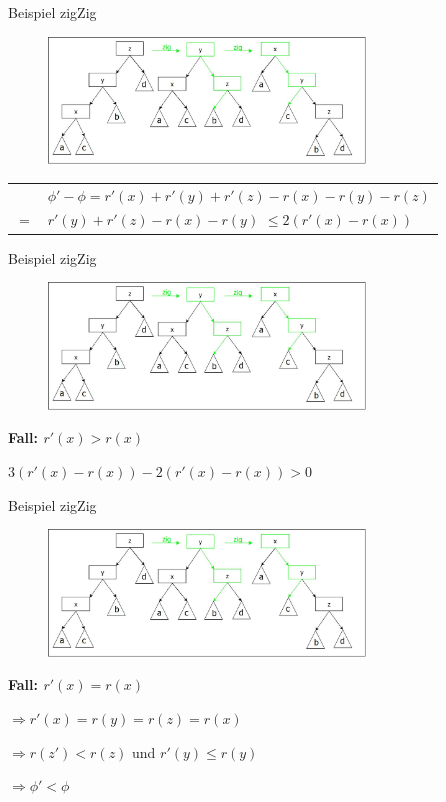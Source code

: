 \documentclass[11pt]{beamer}
\begin{document}
	
	
	
		\begin{frame} {Beispiel zigZig }
				\begin{figure}[h]
				\centering
				\includegraphics[width=0.75\textwidth]{"bilder/zigzigRotation"}
			\end{figure}
			
				\begin{tabular}{ll}
					& $\phi' - \phi = r'(x) + r'(y)+ r'(z) - r(x) - r(y) - r(z)$\\
					\pause
					$=$ &  $r'(y)+ r'(z) - r(x) - r(y)$  $\leq 2(r'(x) - r(x))$ 
				\end{tabular}
		\end{frame}	

			\begin{frame} {Beispiel zigZig }
			\begin{figure}[h]
				\centering
				\includegraphics[width=0.75\textwidth]{"bilder/zigzigRotation"}
			\end{figure}
			\textbf{Fall: $r'(x) > r(x)$}
			
			$ 3(r'(x) - r(x)) -  2(r'(x) - r(x)) > 0$
			
			
		\end{frame}	

	\begin{frame} {Beispiel zigZig }
		\begin{figure}[h]
			\centering
			\includegraphics[width=0.75\textwidth]{"bilder/zigzigRotation"}
		\end{figure}
		\textbf{Fall: $r'(x) = r(x)$}
		
		$\Rightarrow r'(x) = r(y) = r(z) = r(x)$
		
		$\Rightarrow r(z') < r(z) $ und $r'(y) \leq r(y)$
		
		$\Rightarrow \phi' < \phi$
	
	\end{frame}		
	
\end{document}
